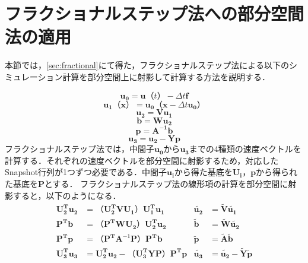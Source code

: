 \documentclass[a4j,12pt]{jreport}
\begin{document}
\section{フラクショナルステップ法への部分空間法の適用}
本節では，\ref{sec:fractional}にて得た，フラクショナルステップ法による以下のシミュレーション計算を部分空間上に射影して計算する方法を説明する．


\[
	\bm{u_0} =  \bm{u} （t）  - \varDelta t \bm{f} 	
\]
\[
	\bm{u_1}（\bm{x}） = \bm{u_0}（\bm{x}  - \varDelta t \bm{u_0}）
\]
\[
	\bm{u_2}   =  \mathbf{V}\bm{u_1}
\]
\[
	\bm{b} = \mathbf{W}\bm{u_2}
\]
\[
	\bm{p} = \mathbf{A^{-1}}\bm{b}
\]
\[
	\bm{u_3}  =  \bm{u_2} - \mathbf{Y}\bm{p} 
\]
フラクショナルステップ法では，中間子$\bm{u_0}$から$\bm{u_3}$までの4種類の速度ベクトルを計算する．それぞれの速度ベクトルを部分空間に射影するため，対応したSnapshot行列が1つずつ必要である．中間子$\bm{u_i}$から得た基底を$\mathbf{U_i}$，$\bm{p}$から得られた基底を$\mathbf{P}$とする．
フラクショナルステップ法の線形項の計算を部分空間に射影すると，以下のようになる．
\begin{align*}
 \mathbf{U_2^T}\bm{u_2}	& = （\mathbf{U_2^T}\mathbf{V}\mathbf{U_1}）\mathbf{U_1^T}\bm{u_1} 					&\bm{\tilde{u_2}} 		&= \mathbf{\tilde{V}}\bm{\tilde{u_1}}	\\
 \mathbf{P^T}\bm{b}		& = （\mathbf{P^T}\mathbf{W}\mathbf{U_2}）\mathbf{U_2^T}\bm{u_2}        				&\bm{\tilde{b}}			&= \mathbf{\tilde{W}}\bm{\tilde{u_2}}	\\
 \mathbf{P^T}\bm{p} 		&= （\mathbf{P^T}\mathbf{A}^{-1}\mathbf{P}）\mathbf{P^T}\bm{b}						&\bm{\tilde{p}}			&= \mathbf{\tilde{A}}\bm{\tilde{b}}\\
 \mathbf{U_3^T}\bm{u_3} 	&=  \mathbf{U_2^T}\bm{u_2} - （\mathbf{U_3^T}\mathbf{Y}\mathbf{P}）\mathbf{P^T}\bm{p}	&\bm{\tilde{u_3}}		&= \bm{\tilde{u_2}}  -  \mathbf{\tilde{Y}}\bm{\tilde{p}}
\end{align*}
\end{document}
